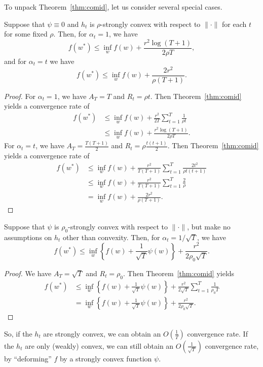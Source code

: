 \documentclass[paper.tex]{subfiles}
\begin{document}
To unpack Theorem~\ref{thm:comid}, let us consider several special cases.
\begin{corollary}
Suppose that $\psi \equiv 0$ and $h_t$ is $\rho$-strongly convex with respect to 
$\|\cdot\|$ for each $t$ for some fixed $\rho$. Then, for $\alpha_t = 1$, we have
\[ f(w^*) \leq \inf_w f(w) + \frac{r^2 \log(T+1)}{2\rho T}, \]
and for $\alpha_t = t$ we have
\[ f(w^*) \leq \inf_w f(w) + \frac{2r^2}{\rho (T+1)}. \]
\end{corollary}
\begin{proof}
For $\alpha_t = 1$, we have $A_T = T$ and $R_t = \rho t$. Then Theorem~\ref{thm:comid} 
yields a convergence rate of
\begin{align*}
f(w^*) &\leq \inf_w f(w) + \frac{r^2}{2T} \sum_{t=1}^T \frac{1}{\rho t} \\
 &\leq \inf_w f(w) + \frac{r^2 \log(T+1)}{2\rho T}.
\end{align*}
For $\alpha_t = t$, we have $A_T = \frac{T(T+1)}{2}$ and $R_t = \rho \frac{t(t+1)}{2}$. 
Then Theorem~\ref{thm:comid} yields a convergence rate of
\begin{align*}
f(w^*) &\leq \inf_w f(w) + \frac{r^2}{T(T+1)} \sum_{t=1}^T \frac{2t^2}{\rho t(t+1)} \\
 &\leq \inf_w f(w) + \frac{r^2}{T(T+1)} \sum_{t=1}^T \frac{2}{\rho} \\
 &= \inf_w f(w) + \frac{2r^2}{\rho (T+1)}.
\end{align*}
\end{proof}

\begin{corollary}
Suppose that $\psi$ is $\rho_0$-strongly convex with respect to $\|\cdot\|$, but make 
no assumptions on $h_t$ other than convexity. Then, for $\alpha_t = 1/\sqrt{T}$, we have
\[ f(w^*) \leq \inf_w \left\{ f(w) + \frac{1}{\sqrt{T}} \psi(w)\right\} + \frac{r^2}{2\rho_0\sqrt{T}}. \]
\end{corollary}
\begin{proof}
We have $A_T = \sqrt{T}$ and $R_t = \rho_0$. Then Theorem~\ref{thm:comid} yields
\begin{align*}
f(w^*) &\leq \inf_w \left\{ f(w) + \frac{1}{\sqrt{T}} \psi(w)\right\} + \frac{r^2}{2\sqrt{T}} \sum_{t=1}^T \frac{1}{\rho_0 T} \\
 &= \inf_w \left\{ f(w) + \frac{1}{\sqrt{T}} \psi(w)\right\} + \frac{r^2}{2\rho_0\sqrt{T}}.
\end{align*}
\end{proof}
So, if the $h_t$ are strongly convex, we can obtain an $O\left(\frac{1}{T}\right)$ 
convergence rate. If the $h_t$ are only (weakly) convex, we can still obtain an 
$O\left(\frac{1}{\sqrt{T}}\right)$ convergence rate, by ``deforming'' $f$ by a 
strongly convex function $\psi$.
\end{document}
